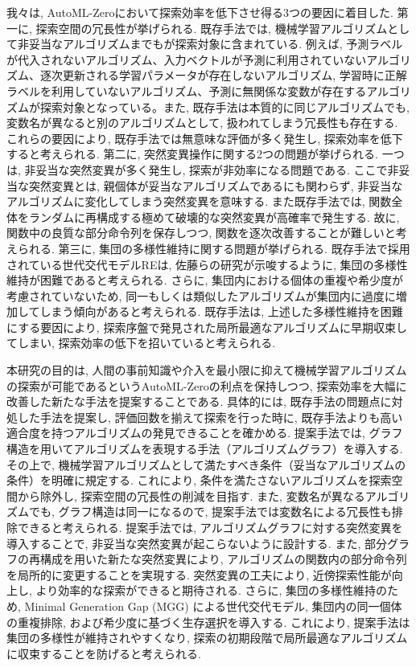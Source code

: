 \documentclass[11pt,oneside,openany,report]{jsbook}
\begin{document}
我々は, AutoML-Zeroにおいて探索効率を低下させ得る3つの要因に着目した. 第一に, 探索空間の冗長性が挙げられる. 既存手法では, 機械学習アルゴリズムとして非妥当なアルゴリズムまでもが探索対象に含まれている. 例えば, 予測ラベルが代入されないアルゴリズム、入力ベクトルが予測に利用されていないアルゴリズム、逐次更新される学習パラメータが存在しないアルゴリズム, 学習時に正解ラベルを利用していないアルゴリズム、予測に無関係な変数が存在するアルゴリズムが探索対象となっている。また, 既存手法は本質的に同じアルゴリズムでも, 変数名が異なると別のアルゴリズムとして, 扱われてしまう冗長性も存在する. これらの要因により, 既存手法では無意味な評価が多く発生し, 探索効率を低下すると考えられる. 第二に, 突然変異操作に関する2つの問題が挙げられる. 一つは, 非妥当な突然変異が多く発生し, 探索が非効率になる問題である. ここで非妥当な突然変異とは, 親個体が妥当なアルゴリズムであるにも関わらず, 非妥当なアルゴリズムに変化してしまう突然変異を意味する. また既存手法では, 関数全体をランダムに再構成する極めて破壊的な突然変異が高確率で発生する. 故に, 関数中の良質な部分命令列を保存しつつ, 関数を逐次改善することが難しいと考えられる. 第三に, 集団の多様性維持に関する問題が挙げられる. 既存手法で採用されている世代交代モデルREは, 佐藤らの研究が示唆するように, 集団の多様性維持が困難であると考えられる\cite{mgg}. さらに, 集団内における個体の重複や希少度が考慮されていないため, 同一もしくは類似したアルゴリズムが集団内に過度に増加してしまう傾向があると考えられる. 既存手法は, 上述した多様性維持を困難にする要因により, 探索序盤で発見された局所最適なアルゴリズムに早期収束してしまい, 探索効率の低下を招いていると考えられる.

本研究の目的は, 人間の事前知識や介入を最小限に抑えて機械学習アルゴリズムの探索が可能であるというAutoML-Zeroの利点を保持しつつ, 探索効率を大幅に改善した新たな手法を提案することである. 具体的には, 既存手法の問題点に対処した手法を提案し, 評価回数を揃えて探索を行った時に, 既存手法よりも高い適合度を持つアルゴリズムの発見できることを確かめる. 提案手法では, グラフ構造を用いてアルゴリズムを表現する手法（アルゴリズムグラフ）を導入する. その上で, 機械学習アルゴリズムとして満たすべき条件（妥当なアルゴリズムの条件）を明確に規定する. これにより, 条件を満たさないアルゴリズムを探索空間から除外し, 探索空間の冗長性の削減を目指す. また, 変数名が異なるアルゴリズムでも, グラフ構造は同一になるので, 提案手法では変数名による冗長性も排除できると考えられる. 提案手法では, アルゴリズムグラフに対する突然変異を導入することで, 非妥当な突然変異が起こらないように設計する. また, 部分グラフの再構成を用いた新たな突然変異により, アルゴリズムの関数内の部分命令列を局所的に変更することを実現する. 突然変異の工夫により, 近傍探索性能が向上し, より効率的な探索ができると期待される. さらに, 集団の多様性維持のため, Minimal Generation Gap (MGG) \cite{mgg}による世代交代モデル, 集団内の同一個体の重複排除, および希少度に基づく生存選択を導入する. これにより, 提案手法は集団の多様性が維持されやすくなり, 探索の初期段階で局所最適なアルゴリズムに収束することを防げると考えられる.
\end{document}
